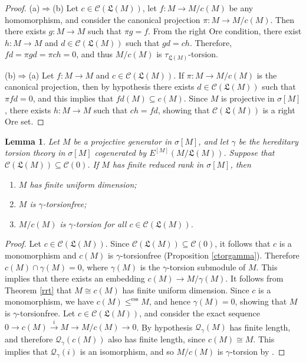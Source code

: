 \documentclass{amsart}
\newtheorem{lemma}[thm]{Lemma}
\theoremstyle{definition}
\theoremstyle{remark}
\numberwithin{equation}{section}
\newcommand{\sm}{\sigma[M]}
\newcommand{\ess}{\leq^\text{ess}}
\begin{document}
\begin{proof}	
	(a)$\Rightarrow$(b) 
	Let $c\in\mathcal{C}(\mathfrak{L}(M))$, 
	let $f:M\to M/c(M)$ be any homomorphism, 
	and consider the canonical projection $\pi:M\to M/c(M)$. 
	Then there exists $g:M\to M$ such that $\pi g=f$. 
	From the right Ore condition, 
	there exist $h:M\to M$ and $d\in\mathcal{C}(\mathfrak{L}(M))$ 
	such that $gd=ch$. 
	Therefore, $fd=\pi gd=\pi ch=0$, 
	and thus $M/c(M)$ is $\tau_{\mathfrak{L}(M)}$-torsion.
	
	(b)$\Rightarrow$(a) 
	Let $f:M\to M$ and $c\in\mathcal{C}(\mathfrak{L}(M))$. 
	If $\pi:M\to M/c(M)$ is the canonical projection, 
	then by hypothesis there exists $d\in\mathcal{C}(\mathfrak{L}(M))$ 
	such that $\pi fd=0$,
	and this implies that $fd(M)\subseteq c(M)$. 
	Since $M$ is projective in $\sm$, 
	there exists $h:M\to M$ such that $ch=fd$, 
	showing that $\mathcal{C}(\mathfrak{L}(M))$ is a right Ore set.
\end{proof}

\begin{lemma}\label{mudimtf}
	Let $M$ be a projective generator in $\sm$,
	and let $\gamma$ be the hereditary torsion theory in $\sm$ 
	cogenerated by $E^{[M]}(M/\mathfrak{L}(M))$. 
	Suppose that $\mathcal{C}(\mathfrak{L}(M))\subseteq\mathcal{C}(0)$. 
	If $M$ has finite reduced rank in $\sm$, then 
	\begin{enumerate}
		\item $M$ has finite uniform dimension;
		\item $M$ is $\gamma$-torsionfree;
		\item $M/c(M)$ is $\gamma$-torsion for all 
		$c\in\mathcal{C}(\mathfrak{L}(M))$.
	\end{enumerate}
\end{lemma}

\begin{proof}
	Let $c\in\mathcal{C}(\mathfrak{L}(M))$. 
	Since $\mathcal{C}(\mathfrak{L}(M))\subseteq\mathcal{C}(0)$, 
	it follows that $c$ is a monomorphism 
	and $c(M)$ is $\gamma$-torsionfree (Proposition \ref{ctorgamma}). 
	Therefore $c(M)\cap\gamma(M)=0$, 
	where $\gamma(M)$ is the $\gamma$-torsion submodule of $M$. 
	This implies that there exists an embedding $c(M)\to M/\gamma(M)$. 
	It follows from Theorem \ref{rrt} 
	that $M\cong c(M)$ has finite uniform dimension. 
	Since $c$ is a monomorphism, 
	we have $c(M)\ess M$, and hence $\gamma(M)=0$, 
	showing that $M$ is $\gamma$-torsionfree. 
	Let $c\in\mathcal{C}(\mathfrak{L}(M))$,
	and consider the exact sequence
	$0\to c(M)\overset{i}{\rightarrow} M\to M/c(M)\to 0$. 
	By hypothesis $\mathcal{Q}_\gamma(M)$ has finite length, 
	and therefore $\mathcal{Q}_\gamma(c(M))$ also has finite length,
	since $c(M)\cong M$. 
	This implies that $\mathcal{Q}_\gamma(i)$ is an isomorphism,
	and so $M/c(M)$ is $\gamma$-torsion by \cite[9.18]{wisbauermodules}.
\end{proof}
\end{document}
